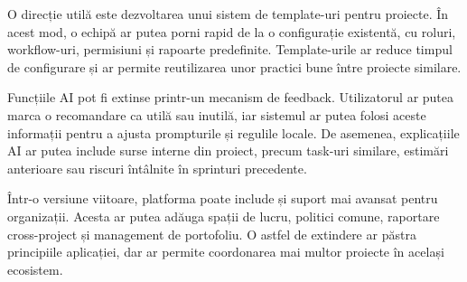 \documentclass[12pt,a4paper]{report}
\begin{document}
O direcție utilă este dezvoltarea unui sistem de template-uri pentru proiecte. În acest mod, o echipă ar putea porni rapid de la o configurație existentă, cu roluri, workflow-uri, permisiuni și rapoarte predefinite. Template-urile ar reduce timpul de configurare și ar permite reutilizarea unor practici bune între proiecte similare.

Funcțiile AI pot fi extinse printr-un mecanism de feedback. Utilizatorul ar putea marca o recomandare ca utilă sau inutilă, iar sistemul ar putea folosi aceste informații pentru a ajusta prompturile și regulile locale. De asemenea, explicațiile AI ar putea include surse interne din proiect, precum task-uri similare, estimări anterioare sau riscuri întâlnite în sprinturi precedente.

Într-o versiune viitoare, platforma poate include și suport mai avansat pentru organizații. Acesta ar putea adăuga spații de lucru, politici comune, raportare cross-project și management de portofoliu. O astfel de extindere ar păstra principiile aplicației, dar ar permite coordonarea mai multor proiecte în același ecosistem.

\cleardoublepage
{}
{}


\end{document}
